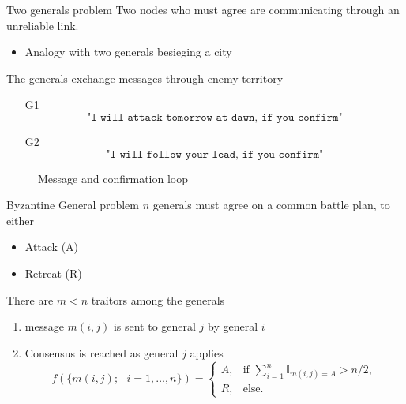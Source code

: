 \documentclass{beamer}
\begin{document}
\begin{frame}{Two generals problem}
Two nodes who must agree are communicating through an unreliable link.
\begin{itemize}
  \item Analogy with two generals besieging a city
\end{itemize}
The generals exchange messages through enemy territory
\begin{itemize}
\item[G1]$$\texttt{"I will attack tomorrow at dawn, if you confirm"}$$
\item[G2] $$\texttt{"I will follow your lead, if you confirm"}$$
\end{itemize}
\begin{figure}[ht!]
 \begin{center}
\end{center}
\caption{Message and confirmation loop}
\label{fig:message_loop}
\end{figure}
\end{frame}
\begin{frame}{Byzantine General problem}
    $n$ generals must agree on a common battle plan, to either 
    \begin{itemize}
    \item Attack (A) 
    \item Retreat (R)
  \end{itemize}
\begin{tcolorbox}[enhanced,drop shadow, title=Problem]
There are $m<n$ traitors among the generals
\end{tcolorbox}
\begin{enumerate}
\item message $m(i,j)$ is sent to general $j$ by general $i$ 
\item Consensus is reached as general $j$ applies 
$$
f(\{m(i,j);\text{ }i = 1,\ldots,n\}) = \begin{cases}
A,& \text{if }\sum_{i = 1}^n\mathbb{I}_{m(i,j) =A} >n/2,\\
R, &\text{else}.
\end{cases}
$$
\end{enumerate}
\end{frame}
\end{document}
